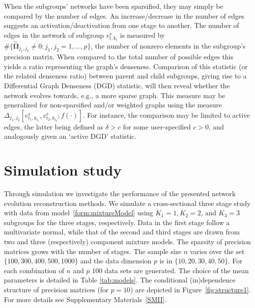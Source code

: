 \documentclass[10pt]{article}
\begin{document}
When the subgroups' networks have been sparsified, they may simply be compared by the number of edges. An increase/decrease in the number of edges suggests an activation/deactivation from one stage to another. The number of edges in the network of subgroup $v^s_{t, k_t}$ is measured by $\# \{ \widehat{\mathbf{\Omega}}_{j_1, j_2} \not= 0 : j_1, j_2 =1, \ldots, p \}$, the number of nonzero elements in the subgroup's precision matrix. When compared to the total number of possible edges this yields a ratio representing the graph's denseness. Comparison of this statistic (or the related denseness ratio) between parent and child subgroups, giving rise to a Differential Graph Denseness (DGD) statistic, will then reveal whether the network evolves towards, e.g., a more sparse graph. This measure may be generalized for non-sparsified and/or weighted graphs using the measure $\Delta_{j_1,j_2} [v^s_{t_1, k_{t_1}}, v^s_{t_2, k_{t_2}}; f(\cdot)]$. For instance, the comparison may be limited to active edges, the latter being defined as $\delta > c$ for some user-specified $c > 0$, and analogously given an `active DGD' statistic.






\section{Simulation study}\label{simulation}
Through simulation we investigate the performance of the presented 
network evolution reconstruction methods. We simulate a cross-sectional three stage study with data from model~\eqref{form:mixtureModel} using $K_1=1, K_2=2$, and $K_3=3$ subgroups for the three stages, respectively. Data in the first stage follow a multivariate normal, while that of the second and third stages are drawn from two and three (respectively) component mixture models. The sparsity of precision matrices grows with the number of stages. The sample size $n$ varies over the set $\{ 100, 300,400, 500, 1000 \}$ and the data dimension $p$ is in $\{10,20,30,40,50\}$. For each combination of $n$ and $p$ 100 data sets are generated. The choice of the mean parameters is detailed in Table \ref{tab:models}. The conditional (in)dependence structure of precision matrices (for $p=10$) are depicted in Figure~\ref{fig:structure1}. %
For more details see Supplementary Materials~\ref{SMII}.
\end{document}
